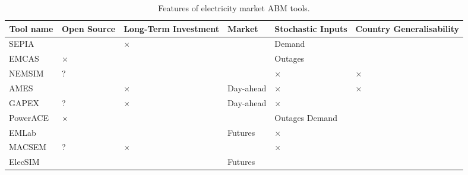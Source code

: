 \documentclass[12pt]{article}
\begin{document}
\begin{table}[]
	\begin{tabular}{m{2.5cm}m{1.2cm}m{1.5cm}m{2cm}m{2cm}m{2cm}} \toprule
		\multicolumn{1}{c}{\textbf{Tool name}} & \textbf{Open Source} & \textbf{Long-Term Investment} & \textbf{Market} & \textbf{Stochastic Inputs} & \textbf{Country Generalisability} \\ \midrule
		SEPIA \cite{Harp2000}  & \checkmark           & $\times$                             & \checkmark      & Demand                     & \checkmark                        \\ 
		EMCAS ~\cite{Conzelmann}   & $\times$                    & \checkmark                    & \checkmark      & Outages                    & \checkmark                        \\ 
		NEMSIM ~\cite{Batten2006}  & ?              & \checkmark                    & \checkmark      & $\times$                          & $\times$                                 \\ 
		AMES  ~\cite{Sun2007} & \checkmark           & $\times$                             & Day-ahead       & $\times$                          & $\times$                                 \\ 
		GAPEX  ~\cite{Cincotti2013} & ?              & $\times$                             & Day-ahead       & $\times$                          & \checkmark                        \\ 
		PowerACE \cite{Rothengatter2007} & $\times$                    & \checkmark                    & \checkmark      & Outages Demand             & \checkmark                        \\ 

		EMLab ~\cite{Chappin2017}  & \checkmark           & \checkmark                    & Futures         & $\times$                          & \checkmark                        \\ 
		MACSEM  ~\cite{Praca2003}  & ?              & $\times$                             & \checkmark      & $\times$                          & \checkmark                        \\ 
		ElecSIM                                  & \checkmark           & \checkmark                    & Futures         & \checkmark                 & \checkmark                        \\ \hline
	\end{tabular}
	\caption{Features of electricity market ABM tools.}
	\label{table:tool_comparison}

\end{table}
\end{document}
